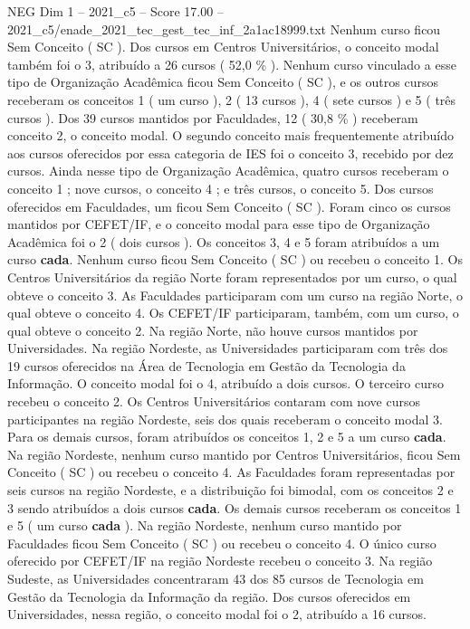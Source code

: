 \begin{textsample}{NEG Dim 1 – 2021\_c5 – Score 17.00 – 2021\_c5/enade\_2021\_tec\_gest\_tec\_inf\_2a1ac18999.txt}
Nenhum curso ficou Sem Conceito ( SC ).
Dos cursos em Centros Universitários, o conceito modal também foi o 3, atribuído a 26 cursos ( 52,0 \% ).
Nenhum curso vinculado a esse tipo de Organização Acadêmica ficou Sem Conceito ( SC ), e os outros cursos receberam os conceitos 1 ( um curso ), 2 ( 13 cursos ), 4 ( sete cursos ) e 5 ( três cursos ).
Dos 39 cursos mantidos por Faculdades, 12 ( 30,8 \% ) receberam conceito 2, o conceito modal.
O segundo conceito mais frequentemente atribuído aos cursos oferecidos por essa categoria de IES foi o conceito 3, recebido por dez cursos.
Ainda nesse tipo de Organização Acadêmica, quatro cursos receberam o conceito 1 ; nove cursos, o conceito 4 ; e três cursos, o conceito 5.
Dos cursos oferecidos em Faculdades, um ficou Sem Conceito ( SC ).
Foram cinco os cursos mantidos por CEFET/IF, e o conceito modal para esse tipo de Organização Acadêmica foi o 2 ( dois cursos ).
Os conceitos 3, 4 e 5 foram atribuídos a um curso \textbf{cada}.
Nenhum curso ficou Sem Conceito ( SC ) ou recebeu o conceito 1.
Os Centros Universitários da região Norte foram representados por um curso, o qual obteve o conceito 3.
As Faculdades participaram com um curso na região Norte, o qual obteve o conceito 4.
Os CEFET/IF participaram, também, com um curso, o qual obteve o conceito 2.
Na região Norte, não houve cursos mantidos por Universidades.
Na região Nordeste, as Universidades participaram com três dos 19 cursos oferecidos na Área de Tecnologia em Gestão da Tecnologia da Informação.
O conceito modal foi o 4, atribuído a dois cursos.
O terceiro curso recebeu o conceito 2.
Os Centros Universitários contaram com nove cursos participantes na região Nordeste, seis dos quais receberam o conceito modal 3.
Para os demais cursos, foram atribuídos os conceitos 1, 2 e 5 a um curso \textbf{cada}.
Na região Nordeste, nenhum curso mantido por Centros Universitários, ficou Sem Conceito ( SC ) ou recebeu o conceito 4.
As Faculdades foram representadas por seis cursos na região Nordeste, e a distribuição foi bimodal, com os conceitos 2 e 3 sendo atribuídos a dois cursos \textbf{cada}.
Os demais cursos receberam os conceitos 1 e 5 ( um curso \textbf{cada} ).
Na região Nordeste, nenhum curso mantido por Faculdades ficou Sem Conceito ( SC ) ou recebeu o conceito 4.
O único curso oferecido por CEFET/IF na região Nordeste recebeu o conceito 3.
Na região Sudeste, as Universidades concentraram 43 dos 85 cursos de Tecnologia em Gestão da Tecnologia da Informação da região.
Dos cursos oferecidos em Universidades, nessa região, o conceito modal foi o 2, atribuído a 16 cursos.

\end{textsample}
